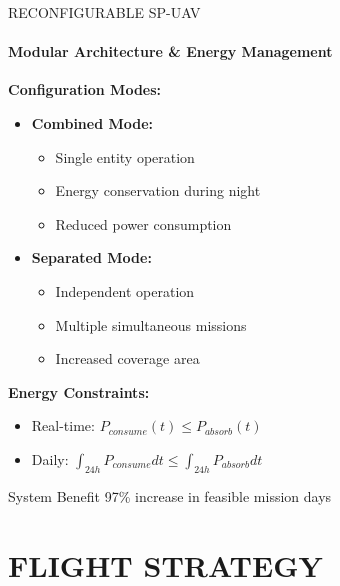 \documentclass{beamer}
\begin{document}
\begin{frame}{RECONFIGURABLE SP-UAV}
    \framesubtitle{Modular Architecture \& Energy Management}
    
    \textbf{Configuration Modes:}
    \begin{itemize}
        \item \textbf{Combined Mode:}
        \begin{itemize}
            \item Single entity operation
            \item Energy conservation during night
            \item Reduced power consumption
        \end{itemize}
        \item \textbf{Separated Mode:}
        \begin{itemize}
            \item Independent operation
            \item Multiple simultaneous missions
            \item Increased coverage area
        \end{itemize}
    \end{itemize}
    
    \vspace{0.3cm}
    \textbf{Energy Constraints:}
    \begin{itemize}
        \item Real-time: $P_{consume}(t) \leq P_{absorb}(t)$
        \item Daily: $\int_{24h} P_{consume}dt \leq \int_{24h} P_{absorb}dt$
    \end{itemize}
    
    \vspace{0.3cm}
    \begin{alertblock}{System Benefit}
        97\% increase in feasible mission days
    \end{alertblock}
\end{frame}

\section{FLIGHT STRATEGY}
\end{document}
